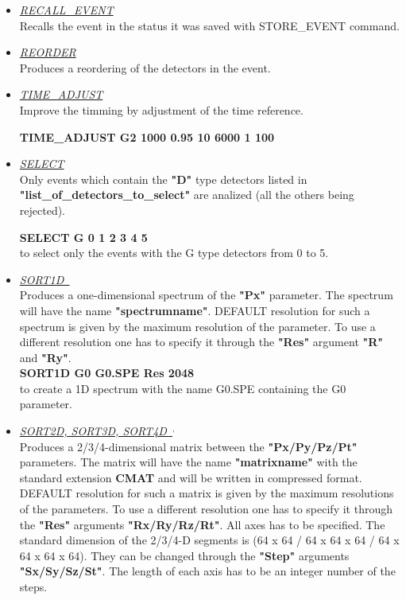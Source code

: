 \begin{itemize}
 \item	{\it\underline{RECALL\_EVENT}} \\

	Recalls the event in the status it was saved with 
	STORE\_EVENT command.

 \item	{\it\underline{REORDER}} \\

	Produces a reordering of the detectors in the event.

 \item	{\it\underline{TIME\_ADJUST}} \\
	Improve the timming by adjustment of the time reference.

	\hskip1cm{\bf TIME\_ADJUST G2 1000 0.95   10 6000  1 100} \\
	

 \item	{\it\underline{SELECT}} \\


	Only events which contain the {\bf "D"} type detectors
	listed in {\bf "list\_of\_detectors\_to\_select"} are analized (all 
	the others being rejected).

	\hskip1cm{\bf SELECT G 0 1 2 3 4 5} \\
	to select only the events with the G type detectors from 0 to 5.

 \item	{\it\underline{SORT1D~}}\footnotemark[5] \\

	Produces a one-dimensional spectrum of the {\bf "Px"} parameter.
	The spectrum will have the name {\bf "spectrumname"}.
	DEFAULT resolution for such a spectrum is given by the maximum
	resolution of the parameter.
	To use a different resolution one has to specify it through the {\bf
	"Res"} argument {\bf "R"} and {\bf "Ry"}.\\

	\hskip1cm{\bf SORT1D  G0 G0.SPE Res 2048}\\
	to create a 1D spectrum with the name G0.SPE containing the G0 
	parameter.

 \item	{\it\underline{SORT2D, SORT3D,
			SORT4D~}}\footnotemark[4]$^,$\footnotemark[5] \\

	Produces a 2/3/4-dimensional matrix between the {\bf "Px/Py/Pz/Pt"} 
	parameters.
	The matrix will have the name {\bf "matrixname"} with the standard
	extension {\bf CMAT} and will be written in compressed format.
	DEFAULT resolution for such a matrix is given by the maximum
	resolutions of the parameters.
	To use a different resolution one has to specify it through the {\bf
	"Res"} arguments {\bf "Rx/Ry/Rz/Rt"}. All axes has to be 
	specified. 
	The standard dimension of the 2/3/4-D segments is 
	(64 x 64 / 64 x 64 x 64 / 64 x 64 x 64 x 64). They can
	be changed through the {\bf "Step"} arguments {\bf "Sx/Sy/Sz/St"}. 
	The length of each axis has to be an integer number of the steps.


\end{itemize}
